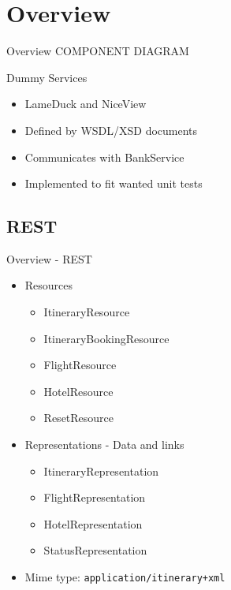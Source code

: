 
\section{Overview}
\begin{frame}{Overview}
COMPONENT DIAGRAM
\end{frame}


\begin{frame}{Dummy Services}
\begin{itemize}[<+->]
\item LameDuck and NiceView
\item Defined by WSDL/XSD documents
\item Communicates with BankService
\item Implemented to fit wanted unit tests
\end{itemize}
\end{frame}


\subsection{REST}
\begin{frame}{Overview - REST}
\begin{itemize}[<+->]
	
	\item Resources
	\begin{itemize}[<2->]
		\item ItineraryResource
		\item ItineraryBookingResource
		\item FlightResource
		\item HotelResource
		\item ResetResource
	\end{itemize}
		
	\medskip\item <3-> Representations - Data and links
	\begin{itemize}[<4->]
		\item ItineraryRepresentation
		\item FlightRepresentation
		\item HotelRepresentation
		\item StatusRepresentation
	\end{itemize}
	
	\item <5-> Mime type: \texttt{application/itinerary+xml}

\end{itemize}
\end{frame}

